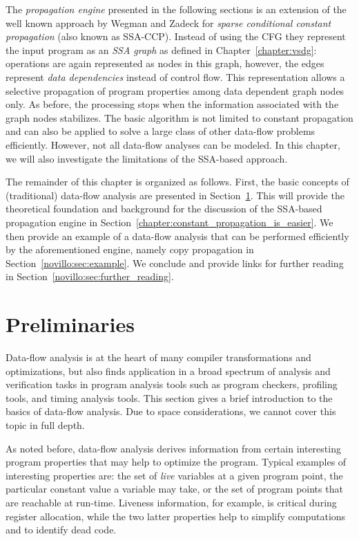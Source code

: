 The \emph{propagation engine} presented in the following sections is an
extension of the well known approach by Wegman and Zadeck for \emph{sparse
conditional constant propagation} (also known as
SSA-CCP). Instead of using the CFG they represent the input program as an
\emph{SSA graph} as defined in Chapter~\ref{chapter:vsdg}: operations are again
represented as
nodes in this graph, however, the edges represent \emph{data dependencies}
instead of control flow. This representation allows a selective propagation of
program properties among data dependent graph nodes only. As before, the
processing stops when the information associated with the graph nodes stabilizes.
The basic algorithm is not limited to constant propagation and can also be
applied to solve a large class of other data-flow problems
efficiently. However, not all data-flow
analyses can be modeled. In this chapter, we will also investigate the limitations
of the SSA-based approach.

The remainder of this chapter is organized as follows. First, the basic concepts
of (traditional) data-flow analysis are presented in
Section~\ref{novillo:sec:preliminaries}. This will provide the theoretical
foundation and background for the discussion of the SSA-based propagation
engine in Section~\ref{chapter:constant_propagation_is_easier}. We then provide an example of a
data-flow analysis that can be performed efficiently by the aforementioned
engine, namely copy propagation in Section~\ref{novillo:sec:example}. We
conclude and provide links for further reading in
Section~\ref{novillo:sec:further_reading}.

\section{Preliminaries}
\label{novillo:sec:preliminaries}

Data-flow analysis is at the heart of many compiler transformations and
optimizations, but also finds application in a broad spectrum of analysis and
verification tasks in program analysis tools such as program checkers, profiling
tools, and timing analysis tools. This section gives a brief introduction to the
basics of data-flow analysis. Due to space considerations, we cannot cover this
topic in full depth.

As noted before, data-flow analysis derives information from certain
interesting program properties that may help to optimize the program. Typical
examples of interesting properties are: the set of \emph{live} variables at a
given program point, the particular constant value a variable may take, or the
set of program points that are reachable at run-time. Liveness information, for
example, is critical during register allocation, while the two latter properties
help to simplify computations and to identify dead code.

